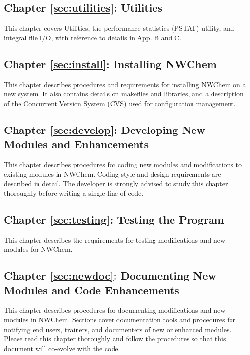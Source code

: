 \subsection*{Chapter \ref{sec:utilities}: Utilities}

This chapter covers Utilities, the performance statistics (PSTAT) utility, 
and integral file I/O, 
with reference to details in App. B and C.

\subsection*{Chapter \ref{sec:install}:  Installing NWChem}

This chapter describes procedures and requirements for installing NWChem on a new system.  
It also contains details on makefiles and libraries, and a description of the Concurrent
Version System (CVS) used for configuration management.

\subsection*{Chapter \ref{sec:develop}:  Developing New Modules and Enhancements}

This chapter describes procedures for coding new modules and modifications  
to existing modules in NWChem.  Coding style and design requirements are described
in detail.  The developer is strongly advised to study this chapter thoroughly before
writing a single line of code.

\subsection*{Chapter \ref{sec:testing}:  Testing the Program}

This chapter describes the requirements for testing modifications and 
new modules for NWChem.

\subsection*{Chapter \ref{sec:newdoc}:  Documenting New Modules and Code Enhancements}

This chapter describes procedures for documenting modifications and 
new modules in NWChem.  Sections cover documentation tools and procedures 
for notifying end users, trainers, and documenters of new or enhanced modules.
Please read this chapter thoroughly and follow the procedures so that this document
will co-evolve with the code.



